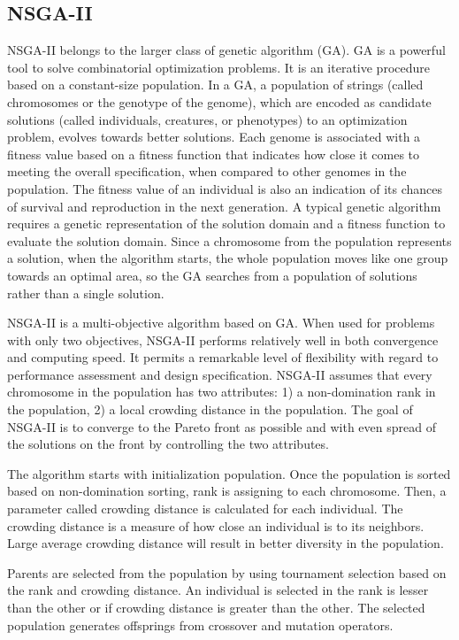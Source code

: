 \documentclass{llncs}
\begin{document}
\subsection{NSGA-II}
NSGA-II \cite{996017} belongs to the larger class of genetic algorithm (GA). GA \cite{man1996genetic} is a powerful tool to solve combinatorial optimization problems. It is an iterative procedure based on a constant-size population. In a GA, a population of strings (called chromosomes
or the genotype of the genome), which are encoded as candidate solutions (called individuals, creatures, or phenotypes) to an optimization problem, evolves towards better solutions. 
Each genome is associated with a fitness value based on a fitness function that indicates how close it comes to meeting the overall specification, when compared to other genomes in the
population. The fitness value of an individual is also an indication of its chances of survival and reproduction in the next generation. A typical genetic algorithm requires a genetic
representation of the solution domain and a fitness function to evaluate the solution domain. Since a chromosome from the population represents a solution, when the algorithm starts, 
the whole population moves like one group towards an optimal area, so the GA searches from a population of solutions rather than a single solution.

NSGA-II is a multi-objective algorithm based on GA. When used for problems with only two objectives, NSGA-II performs 
relatively well in both convergence and  computing speed. It permits a remarkable level of flexibility with regard to 
performance assessment and design specification. NSGA-II assumes that every chromosome in the population has two 
attributes: 1) a non-domination rank in the population, 2) a local crowding distance in the population. The goal of 
NSGA-II is to converge to the Pareto front as possible and with even spread of the solutions on the front by 
controlling the two attributes. 

The algorithm starts with initialization population. Once the population is sorted based on non-domination sorting, rank is assigning to each chromosome.
Then, a parameter called crowding distance is calculated for each individual. The crowding distance is a measure of how close an individual is to its neighbors. Large 
average crowding distance will result in better diversity in the population. 

Parents are selected from the population by using tournament selection based on the rank and crowding distance. An individual is selected in the rank is lesser than the other or 
if crowding distance is greater than the other. The selected population generates offsprings from crossover and mutation operators. 
\end{document}
